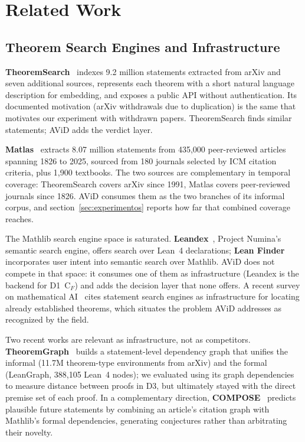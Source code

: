 \section{Related Work}

\label{sec:related}

\subsection{Theorem Search Engines and Infrastructure}

\textbf{TheoremSearch}~\cite{theoremsearch2026} indexes 9.2 million statements extracted from arXiv and seven additional sources, represents each theorem with a short natural language description for embedding, and exposes a public API without authentication. Its documented motivation (arXiv withdrawals due to duplication) is the same that motivates our experiment with withdrawn papers. TheoremSearch finds similar statements; AViD adds the verdict layer.

\textbf{Matlas}~\cite{matlas2026} extracts 8.07 million statements from 435,000 peer-reviewed articles spanning 1826 to 2025, sourced from 180 journals selected by ICM citation criteria, plus 1,900 textbooks. The two sources are complementary in temporal coverage: TheoremSearch covers arXiv since 1991, Matlas covers peer-reviewed journals since 1826. AViD consumes them as the two branches of its informal corpus, and section~\ref{sec:experimentos} reports how far that combined coverage reaches.

The Mathlib search engine space is saturated. \textbf{Leandex}~\cite{leandex2026}, Project Numina's semantic search engine, offers search over Lean~4 declarations; \textbf{Lean Finder}~\cite{leanfinder2025} incorporates user intent into semantic search over Mathlib. AViD does not compete in that space: it consumes one of them as infrastructure (Leandex is the backend for D1~C$_F$) and adds the decision layer that none offers. A recent survey on mathematical AI~\cite{survey2026} cites statement search engines as infrastructure for locating already established theorems, which situates the problem AViD addresses as recognized by the field.

Two recent works are relevant as infrastructure, not as competitors. \textbf{TheoremGraph}~\cite{theoremgraph2026} builds a statement-level dependency graph that unifies the informal (11.7M theorem-type environments from arXiv) and the formal (LeanGraph, 388,105 Lean~4 nodes); we evaluated using its graph dependencies to measure distance between proofs in D3, but ultimately stayed with the direct premise set of each proof. In a complementary direction, \textbf{COMPOSE}~\cite{compose2026} predicts plausible future statements by combining an article's citation graph with Mathlib's formal dependencies, generating conjectures rather than arbitrating their novelty.

